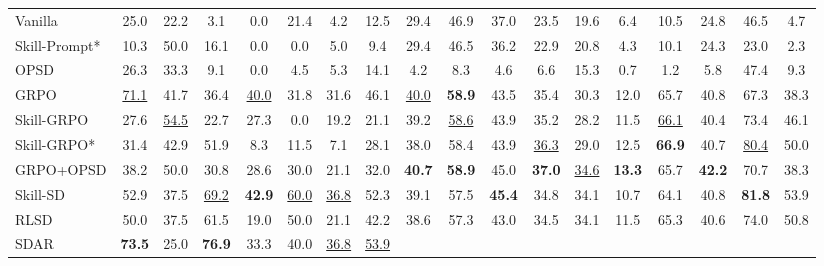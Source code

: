 \begin{table}[ht!]
{\begin{tabular}{l ccccccc cccccccc cc}
    Vanilla
        & 25.0 & 22.2 & 3.1 & 0.0 & 21.4 & 4.2 & 12.5
        & 29.4 & 46.9 & 37.0 & 23.5 & 19.6 & 6.4 & 10.5 & 24.8
        & 46.5 & 4.7
        \\
    Skill-Prompt*
        & 10.3 & 50.0 & 16.1 & 0.0 & 0.0 & 5.0 & 9.4
        & 29.4 & 46.5 & 36.2 & 22.9 & 20.8 & 4.3 & 10.1 & 24.3
        & 23.0 & 2.3
        \\
    OPSD
        & 26.3 & 33.3 & 9.1 & 0.0 & 4.5 & 5.3 & 14.1
        & 4.2 & 8.3 & 4.6 & 6.6 & 15.3 & 0.7 & 1.2 & 5.8
        & 47.4 & 9.3
        \\
    GRPO
        & \cellcolor{secondcolor}\underline{71.1} & 41.7 & 36.4 & \cellcolor{secondcolor}\underline{40.0} & 31.8 & 31.6 & 46.1
        & \cellcolor{secondcolor}\underline{40.0} & \cellcolor{topcolor}\textbf{58.9} & 43.5 & 35.4 & 30.3 & 12.0 & 65.7 & 40.8
        & 67.3 & 38.3
        \\
    Skill-GRPO
        & 27.6 & \cellcolor{secondcolor}\underline{54.5} & 22.7 & 27.3 & 0.0 & 19.2 & 21.1
        & 39.2 & \cellcolor{secondcolor}\underline{58.6} & 43.9 & 35.2 & 28.2 & 11.5 & \cellcolor{secondcolor}\underline{66.1} & 40.4
        & 73.4 & 46.1
        \\
    Skill-GRPO*
        & 31.4 & 42.9 & 51.9 & 8.3 & 11.5 & 7.1 & 28.1
        & 38.0 & 58.4 & 43.9 & \cellcolor{secondcolor}\underline{36.3} & 29.0 & 12.5 & \cellcolor{topcolor}\textbf{66.9} & 40.7
        & \cellcolor{secondcolor}\underline{80.4} & 50.0
        \\
    GRPO+OPSD
        & 38.2 & 50.0 & 30.8 & 28.6 & 30.0 & 21.1 & 32.0
        & \cellcolor{topcolor}\textbf{40.7} & \cellcolor{topcolor}\textbf{58.9} & 45.0 & \cellcolor{topcolor}\textbf{37.0} & \cellcolor{secondcolor}\underline{34.6} & \cellcolor{topcolor}\textbf{13.3} & 65.7 & \cellcolor{topcolor}\textbf{42.2}
        & 70.7 & 38.3
        \\
    Skill-SD
        & 52.9 & 37.5 & \cellcolor{secondcolor}\underline{69.2} & \cellcolor{topcolor}\textbf{42.9} & \cellcolor{secondcolor}\underline{60.0} & \cellcolor{secondcolor}\underline{36.8} & 52.3
        & 39.1 & 57.5 & \cellcolor{topcolor}\textbf{45.4} & 34.8 & 34.1 & 10.7 & 64.1 & 40.8
        & \cellcolor{topcolor}\textbf{81.8} & 53.9
        \\
    RLSD
        & 50.0 & 37.5 & 61.5 & 19.0 & 50.0 & 21.1 & 42.2
        & 38.6 & 57.3 & 43.0 & 34.5 & 34.1 & 11.5 & 65.3 & 40.6
        & 74.0 & 50.8
        \\
    SDAR
        & \cellcolor{topcolor}\textbf{73.5} & 25.0 & \cellcolor{topcolor}\textbf{76.9} & 33.3 & 40.0 & \cellcolor{secondcolor}\underline{36.8} & \cellcolor{secondcolor}\underline{53.9}

\end{tabular}}
\end{table}
